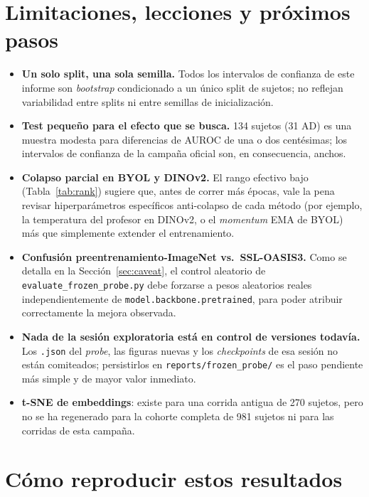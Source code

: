 \documentclass[11pt,a4paper]{article}
\begin{document}
\section{Limitaciones, lecciones y próximos pasos}
\label{sec:limits}

\begin{itemize}
\item \textbf{Un solo split, una sola semilla.} Todos los intervalos de
  confianza de este informe son \emph{bootstrap} condicionado a un único
  split de sujetos; no reflejan variabilidad entre splits ni entre semillas
  de inicialización.
\item \textbf{Test pequeño para el efecto que se busca.} 134 sujetos (31
  AD) es una muestra modesta para diferencias de AUROC de una o dos
  centésimas; los intervalos de confianza de la campaña oficial son, en
  consecuencia, anchos.
\item \textbf{Colapso parcial en BYOL y DINOv2.} El rango efectivo bajo
  (Tabla~\ref{tab:rank}) sugiere que, antes de correr más épocas, vale la
  pena revisar hiperparámetros específicos anti-colapso de cada método
  (por ejemplo, la temperatura del profesor en DINOv2, o el \emph{momentum}
  EMA de BYOL) más que simplemente extender el entrenamiento.
\item \textbf{Confusión preentrenamiento-ImageNet vs.\ SSL-OASIS3.} Como se
  detalla en la Sección~\ref{sec:caveat}, el control aleatorio de
  \texttt{evaluate\_frozen\_probe.py} debe forzarse a pesos aleatorios
  reales independientemente de \texttt{model.backbone.pretrained}, para
  poder atribuir correctamente la mejora observada.
\item \textbf{Nada de la sesión exploratoria está en control de versiones
  todavía.} Los \texttt{.json} del \emph{probe}, las figuras nuevas y los
  \emph{checkpoints} de esa sesión no están comiteados; persistirlos en
  \texttt{reports/frozen\_probe/} es el paso pendiente más simple y de
  mayor valor inmediato.
\item \textbf{t-SNE de embeddings}: existe para una corrida antigua de 270
  sujetos, pero no se ha regenerado para la cohorte completa de 981
  sujetos ni para las corridas de esta campaña.
\end{itemize}

\section{Cómo reproducir estos resultados}
\label{sec:repro}
\end{document}
